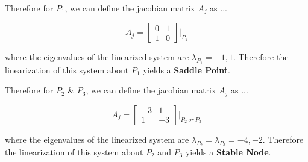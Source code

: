     Therefore for $P_1$, we can define the jacobian matrix $A_j$ as ...

    $$ A_j =
    \begin{bmatrix}
        0 & 1 \\
        1 & 0
    \end{bmatrix}\Big|_{P_1}
    $$

    where the eigenvalues of the linearized system are $\lambda_{P_{1}} = -1, 1$. Therefore the linearization of this system about $P_1$ yields a \textbf{Saddle Point}.

    Therefore for $P_2$ \& $P_3$, we can define the jacobian matrix $A_j$ as ...

    $$ A_j =
    \begin{bmatrix}
        -3 & 1 \\
        1 & -3
    \end{bmatrix}\Big|_{P_2 \: or \: P_3}
    $$

    where the eigenvalues of the linearized system are $\lambda_{P_{2}} = \lambda_{P_{3}} = -4, -2$. Therefore the linearization of this system about $P_2$ and $P_3$ yields a \textbf{Stable Node}.
